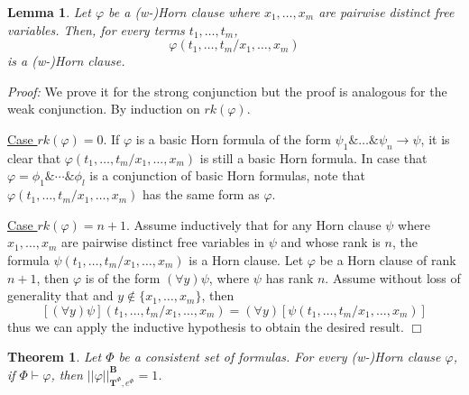 \documentclass{IOS-Book-Article}
\newtheorem{theorem}{Theorem}
\newtheorem{lemma}{Lemma}
\newenvironment{proof}{ \noindent \textit{Proof:} }
{\hfill$\Box$\endtrivlist}
\begin{document}
\begin{lemma} \label{Horn substitucio}
Let $\varphi$ be a (w-)Horn clause where $x_1,\ldots,x_m$ are pairwise distinct free variables. Then, for every terms $t_1,\ldots,t_m$, $$\varphi (t_1,\ldots,t_m/x_1,\ldots,x_m)$$ is a (w-)Horn clause.
\end{lemma}
\begin{proof}
We prove it for the strong conjunction but the proof is analogous for the weak conjunction. By induction on $rk(\varphi)$.

\bigskip

\underline{Case $rk(\varphi)=0$}. If $\varphi$ is a basic Horn formula of the form $\psi_1\& \ldots \&\psi_n\rightarrow\psi$, it is clear that $\varphi (t_1,\ldots,t_m/x_1,\ldots,x_m)$ is still a basic Horn formula. In case that $\varphi=\phi_1\& \dotsb\&\phi_l$ is a conjunction of basic Horn formulas, note that $\varphi (t_1,\ldots,t_m/x_1,\ldots,x_m)$ has the same form as $\varphi$.

\bigskip

\underline{Case $rk(\varphi)=n+1$}. Assume inductively that for any Horn clause $\psi$ where $x_1,\ldots,x_m$ are pairwise distinct free variables in $\psi$ and whose rank is $n$, the formula $\psi (t_1,\ldots,t_m/x_1,\ldots,x_m)$ is a Horn clause. Let $\varphi$ be a Horn clause of rank $n+1$, then $\varphi$ is of the form $(\forall y)\psi$, where $\psi$ has rank $n$. Assume without loss of generality that and $y\not\in\{x_1,\ldots,x_m\}$, then$$[(\forall y)\psi](t_1,\ldots,t_m/x_1,\ldots,x_m)=(\forall y)[\psi(t_1,\ldots,t_m/x_1,\ldots,x_m)]$$ thus we can apply the inductive hypothesis to obtain the desired result.  \end{proof}


\begin{theorem} \label{theorem Horn formulas}
Let $\Phi$ be a consistent set of formulas. For every (w-)Horn clause $\varphi$, if $\Phi\vdash\varphi$, then $|| \varphi||^{\textbf{B}}_{\mathrm{\mathbf{T}}^{\Phi},e^{\Phi}}=1$.
\end{theorem}
\end{document}

